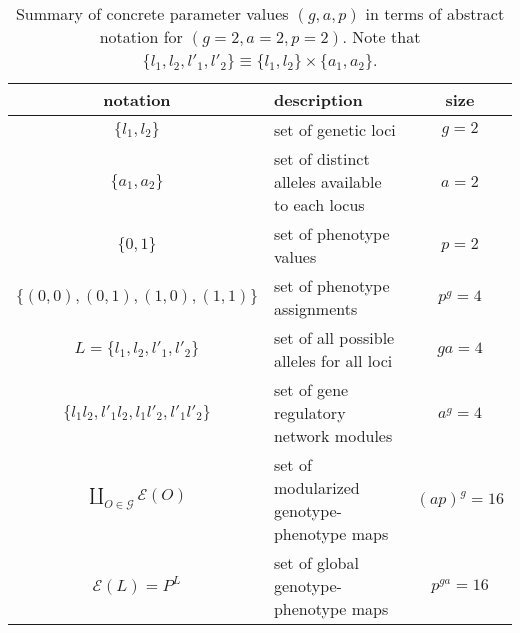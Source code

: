 \begin{table}[!ht]
\centering
\begin{tabular}{ c | l | c }
	\textbf{notation} & \textbf{description} & \textbf{size}\\ \hline \hline
	$\{l_1,l_2\}$ & set of genetic loci & $g = 2$\\ \hline
	$\{a_1,a_2\}$ & set of distinct alleles available to each locus & $a = 2$\\ \hline
	$\{0,1\}$ & set of phenotype values & $p = 2$\\ \hline
	$\{(0,0),(0,1),(1,0),(1,1)\}$ & set of phenotype assignments & $p^g = 4$\\ \hline
	$L = \{l_1,l_2,l'_1,l'_2\}$ & set of all possible alleles for all loci & $ga = 4$\\ \hline
	$\{l_1 l_2,l'_1 l_2,l_1 l'_2,l'_1 l'_2\}$ & set of gene regulatory network modules & $a^g = 4$\\ \hline
$\coprod_{O \in \mathcal{G}} \mathcal{E}(O)$ & set of modularized genotype-phenotype maps  & $(ap)^g = 16$\\ \hline
	$\mathcal{E}(L) = P^L$ & set of global genotype-phenotype maps & $p^{ga} = 16$\\
    \end{tabular}
\caption{Summary of concrete parameter values $(g,a,p)$ in terms of abstract notation for $(g=2,a=2,p=2)$. Note that $\{l_1,l_2,l'_1,l'_2\} \equiv \{l_1,l_2\} \times \{a_1,a_2\}$.}
\label{tab:pars222}
\end{table}
